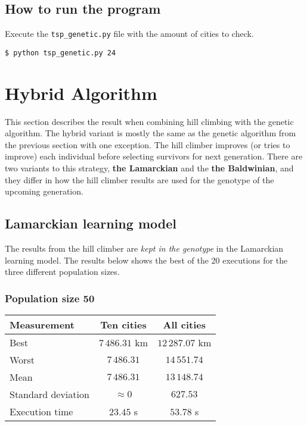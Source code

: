 \documentclass{article}
\begin{document}
\subsection*{How to run the program}

Execute the \texttt{tsp\_genetic.py} file with the amount of cities to check.

\begin{verbatim}
$ python tsp_genetic.py 24
\end{verbatim}

\section*{Hybrid Algorithm}

This section describes the result when combining hill climbing with the genetic algorithm. The hybrid variant is mostly the same as the genetic algorithm from the previous section with one exception. The hill climber improves (or tries to improve) each individual before selecting survivors for next generation. There are two variants to this strategy, \textbf{the Lamarckian} and the \textbf{the Baldwinian}, and they differ in how the hill climber results are used for the genotype of the upcoming generation.

\subsection*{Lamarckian learning model}

The results from the hill climber are \textit{kept in the genotype} in the Lamarckian learning model. The results below shows the best of the 20 executions for the three different population sizes.

\subsubsection*{Population size 50}

\begin{center}
\begin{tabular}{lcc}
\toprule
Measurement & Ten cities & All cities \\
\midrule
Best & $7\,486.31$ km & $12\,287.07$ km \\
Worst & $7\,486.31$ & $14\,551.74$ \\
Mean & $7\,486.31$ & $13\,148.74$ \\
Standard deviation & $\approx 0$ & $627.53$ \\
Execution time & $23.45$ s & $53.78$ s \\
\bottomrule
\end{tabular}
\end{center}
\end{document}

